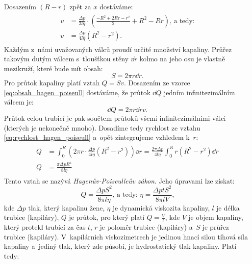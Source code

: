 \documentclass[12pt]{article}
\begin{document}
Dosazením $(R-r)$ zpět za $x$ dostáváme:
\begin{align}
    \begin{split}
        v &= \frac{\Delta p}{2l\eta}\cdot\left(\frac{-R^2+2Rr-r^2}{2}+R^2-Rr\right)\text{, a~tedy:}\\
        v &= \frac{\Delta p}{4l\eta}(R^2-r^2)\text{.}
        \label{eq:rychlost_hagen_poiseull}
    \end{split}
\end{align}
Každým z~námi uvažovaných válců proudí určité množství kapaliny. Průřez takovým dutým válcem s~tloušťkou stěny $\dd r$ kolmo na jeho osu je vlastně mezikruží, které bude mít obsah:
\begin{equation}
    S = 2\pi r\dd r\text{.}
    \label{eq:obsah_hagen_poiseull}
\end{equation}
Pro průtok kapaliny platí vztah $Q = Sv$. Dosazením ze vzorce \ref{eq:obsah_hagen_poiseull} dostáváme, že průtok $\dd Q$ jedním infinitezimálním válcem je:~\cite{book:Calibration_of_viscometers}
\begin{equation}
    \dd Q = 2\pi r\dd rv\text{.}
\end{equation}
Průtok celou trubicí je pak součtem průtoků všemi infinitezimálními válci (kterých je nekonečně mnoho). Dosadíme tedy rychlost ze vztahu \ref{eq:rychlost_hagen_poiseull} a~opět zintegrujeme vzhledem k~$r$:~\cite{book:Calibration_of_viscometers}
\begin{align}
    \begin{split}
        Q &= \int_0^R\left(2\pi r\cdot \frac{\Delta p}{4l\eta}(R^2-r^2)\right)\dd r = \frac{2\pi\Delta p}{4l\eta}\int_0^R r(R^2-r^2)\dd r\\
        Q &= \frac{\pi\Delta pR^4}{8l\eta}
    \end{split}
\end{align}
Tento vztah se nazývá \emph{Hagenův-Poiseulleův zákon}. Jeho úpravami lze získat:~\cite{wiki:Hagen-Poiseulle_equation}\cite{thesis:Viskozimetr_pro_viskozni_materialy}
\begin{equation}
    Q = \frac{\Delta pS^2}{8\pi l\eta}\text{, a~tedy: } \eta = \frac{\Delta ptS^2}{8\pi lV}\text{,}
    \label{eq:Hagen_Poiseull}
\end{equation}
kde $\Delta p$ tlak, který kapalinu žene, $\eta$ je dynamická viskozita kapaliny, $l$ je délka trubice (kapiláry), $Q$ je průtok, pro který platí $Q=\frac{V}{t}$, kde $V$ je objem kapaliny, který protekl trubicí za čas $t$, $r$ je poloměr trubice (kapiláry) a~$S$ je průřez trubice (kapiláry). V~kapilárních viskozimetrech je jedinou hnací silou tíhová síla kapaliny a~jediný tlak, který zde působí, je hydrostatický tlak kapaliny. Platí tedy:
\end{document}
